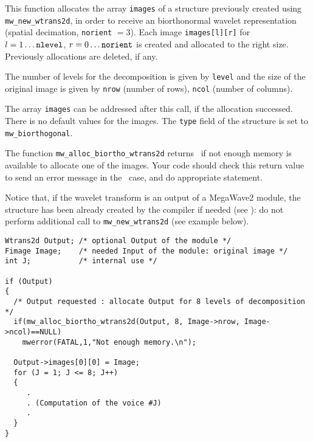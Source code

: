 \Description
This function allocates the array \verb+images+ of a \wtransdd structure previously created using \verb+mw_new_wtrans2d+, in order to receive
an biorthonormal wavelet representation (spatial decimation, \verb+norient+ $=3$).
Each image \verb+images[l][r]+ for $l=1 \ldots \mbox{{\tt nlevel}}$, $r=0 \ldots \mbox{{\tt norient}}$ is created and allocated to the right size.
Previously allocations are deleted, if any.

The number of levels for the decomposition is given by \verb+level+ and the
size of the original image is given by \verb+nrow+ (number of rows), \verb+ncol+ (number of columns).

The array \verb+images+ can be addressed after this call, if the allocation successed. There is no default values for the images.
The \verb+type+ field of the \wtransdd structure is set to \verb+mw_biorthogonal+.

The function \verb+mw_alloc_biortho_wtrans2d+ returns \Null\ if not enough memory is available to allocate one of the images. 
Your code should check this return value to send an error message in the \Null\ case, and do appropriate statement.

Notice that, if the wavelet transform is an output of a MegaWave2 module, the structure has been already created by the compiler if needed (see \volI): do not perform additional call to \verb+mw_new_wtrans2d+ (see example below).

\Next
\Example
\begin{verbatim}
Wtrans2d Output; /* optional Output of the module */
Fimage Image;    /* needed Input of the module: original image */
int J;           /* internal use */

if (Output) 
{
  /* Output requested : allocate Output for 8 levels of decomposition */
  if(mw_alloc_biortho_wtrans2d(Output, 8, Image->nrow, Image->ncol)==NULL)
    mwerror(FATAL,1,"Not enough memory.\n");
  
  Output->images[0][0] = Image;
  for (J = 1; J <= 8; J++)
  {
     .
     . (Computation of the voice #J)
     .
  }
}
\end{verbatim}

\newpage %

